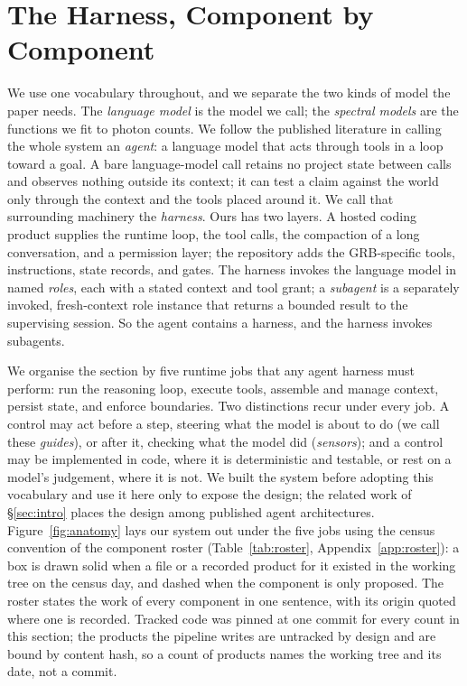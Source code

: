 \section{The Harness, Component by Component} \label{sec:harness}\label{sec:workflow}

We use one vocabulary throughout, and we separate the two kinds of model
the paper needs. The \emph{language model} is the model we call; the
\emph{spectral models} are the functions we fit to photon counts. We
follow the published literature in calling the whole system an
\emph{agent}: a language model that acts through tools in a loop toward a
goal. A bare language-model call retains no project state between calls
and observes nothing outside its context; it can test a claim against the
world only through the context and the tools placed around it. We call
that surrounding machinery the \emph{harness}. Ours has two layers. A
hosted coding product supplies the runtime loop, the tool calls, the
compaction of a long conversation, and a permission layer; the repository
adds the GRB-specific tools, instructions, state records, and gates. The
harness invokes the language model in named \emph{roles}, each with a
stated context and tool grant; a \emph{subagent} is a separately invoked,
fresh-context role instance that returns a bounded result to the
supervising session. So the agent contains a harness, and the harness
invokes subagents.

We organise the section by five runtime jobs that any agent harness must
perform: run the reasoning loop, execute tools, assemble and manage
context, persist state, and enforce boundaries. Two distinctions recur
under every job. A control may act before a step, steering what the model
is about to do (we call these \emph{guides}), or after it, checking what
the model did (\emph{sensors}); and a control may be implemented in code,
where it is deterministic and testable, or rest on a model's judgement,
where it is not. We built the system before adopting this vocabulary and
use it here only to expose the design; the related work of
\S\ref{sec:intro} places the design among published agent architectures.
Figure~\ref{fig:anatomy} lays our system out under the five jobs using the
census convention of the component roster (Table~\ref{tab:roster},
Appendix~\ref{app:roster}): a box is drawn solid when a file or a recorded
product for it existed in the working tree on the census day, and dashed
when the component is only proposed. The roster states the work of every
component in one sentence, with its origin quoted where one is recorded.
Tracked code was pinned at one commit\prov{} for every count in this
section; the products the pipeline writes are untracked by design and are
bound by content hash, so a count of products names the working tree and
its date, not a commit.

